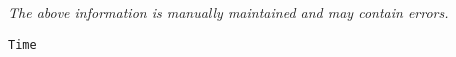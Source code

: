 \label{pkg:time}

{\tiny \it The above information is manually maintained and may contain errors.}
\begin{verbatim}
Time
\end{verbatim}
